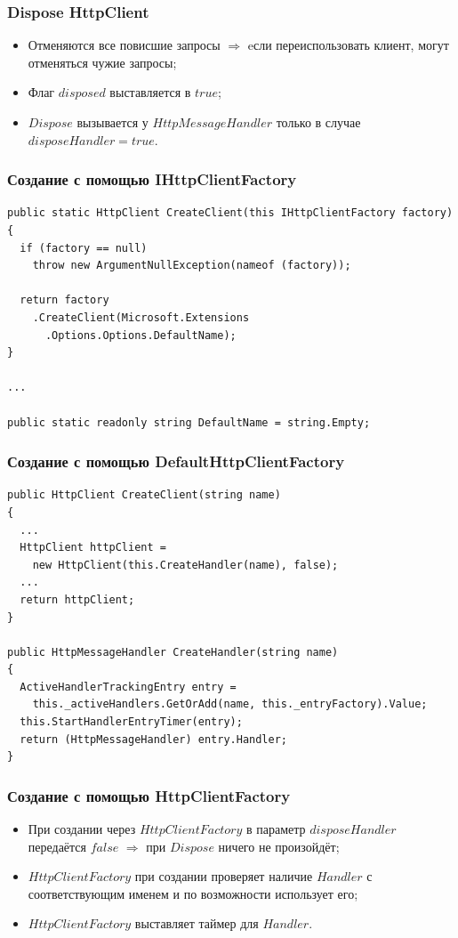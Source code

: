 \documentclass{beamer}
\begin{document}
\begin{frame}
\frametitle{Dispose HttpClient}
\begin{itemize}
	\item Отменяются все повисшие запросы $\Rightarrow$ eсли переиспользовать клиент, могут отменяться чужие запросы;
	\item Флаг $disposed$ выставляется в $true$;
	\item $Dispose$ вызывается у $HttpMessageHandler$ только в случае $disposeHandler = true$.
\end{itemize}
\end{frame}

\begin{frame}[fragile]
\frametitle{Создание с помощью IHttpClientFactory}
\begin{lstlisting}
public static HttpClient CreateClient(this IHttpClientFactory factory)
{
  if (factory == null)
    throw new ArgumentNullException(nameof (factory));
  
  return factory
    .CreateClient(Microsoft.Extensions
      .Options.Options.DefaultName);
}

...

public static readonly string DefaultName = string.Empty;
\end{lstlisting}
\end{frame}

\begin{frame}[fragile]
\frametitle{Создание с помощью DefaultHttpClientFactory}
\begin{lstlisting}
public HttpClient CreateClient(string name)
{
  ...
  HttpClient httpClient = 
    new HttpClient(this.CreateHandler(name), false);
  ...
  return httpClient;
}

public HttpMessageHandler CreateHandler(string name)
{
  ActiveHandlerTrackingEntry entry = 
    this._activeHandlers.GetOrAdd(name, this._entryFactory).Value;
  this.StartHandlerEntryTimer(entry);
  return (HttpMessageHandler) entry.Handler;
}
\end{lstlisting}
\end{frame}

\begin{frame}
\frametitle{Создание с помощью HttpClientFactory}
\begin{itemize}
	\item При создании через $HttpClientFactory$ в параметр $disposeHandler$ передаётся $false$ $\Rightarrow$ при $Dispose$ ничего не произойдёт;
	\item $HttpClientFactory$ при создании проверяет наличие $Handler$ с соответствующим именем и по возможности использует его;
	\item $HttpClientFactory$ выставляет таймер для $Handler$.
\end{itemize}
\end{frame}
\end{document}
